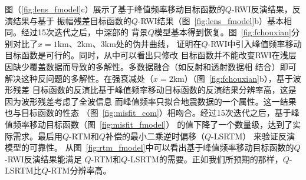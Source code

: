 图（\ref{fig:lens_fmodel}c）展示了基于峰值频率移动目标函数的$Q$-RWI反演结果，反演结果与基于
振幅残差目标函数的$Q$-RWI结果（图~\ref{fig:lens_fmodel}b）基本相同。经过15次迭代之后，中深部的
背景$Q$模型基本得到恢复。图~\ref{fig:fchouxian}分别对比了$x=1$km、2km、3km处的伪井曲线，
证明在$Q$-RWI中引入峰值频率移动目标函数是可行的。同时，从中可以看出只修改
目标函数并不能改变RWI在浅层因缺少覆盖数据而导致的多解性。多数据融合（如反射和透射数据相
结合）即可解决这种反问题的多解性。在强衰减处（$x=2$km）（图~\ref{fig:fchouxian}b），基于波形残差
目标函数的反演比基于峰值频率移动目标函数的反演结果分辨率高，这是因为波形残差考虑了全波信息
而峰值频率只拟合地震数据的一个属性。这一结果也与目标函数的性态
（图~\ref{fig:misfit_com}）相吻合。经过15次迭代之后，基于峰值频率移动目标函数（图~\ref{fig:misfit_fmodel}）
的值下降了一个数量级，达到了实际需求。最后用$Q$-RTM和$Q$补偿的最小二乘逆时偏移（$Q$-LSRTM）
来验证反演模型的可靠性。
从图~\ref{fig:rtm_fmodel}中可以看出基于峰值频率移动目标函数的$Q$-RWI反演结果能满足
$Q$-RTM和$Q$-LSRTM的需要。正如我们所预期的那样，$Q$-LSRTM比$Q$-RTM分辨率高。

